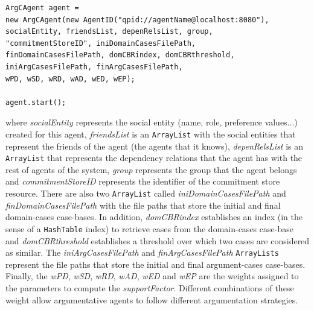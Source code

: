 \begin{lstlisting}
ArgCAgent agent =
new ArgCAgent(new AgentID("qpid://agentName@localhost:8080"),
socialEntity, friendsList, depenRelsList, group,
"commitmentStoreID", iniDomainCasesFilePath,
finDomainCasesFilePath, domCBRindex, domCBRthreshold,
iniArgCasesFilePath, finArgCasesFilePath,
wPD, wSD, wRD, wAD, wED, wEP);

agent.start();
\end{lstlisting}

where \emph{socialEntity} represents the social entity (name, role, preference values...) created for this agent, \emph{friendsList} is an \lstinline{ArrayList} with the social entities that represent the friends of the agent (the agents that it knows), \emph{depenRelsList} is an \lstinline{ArrayList} that represents the dependency relations that the agent has with the rest of agents of the system, \emph{group} represents the group that the agent belongs and \emph{commitmentStoreID} represents the identifier of the commitment store resource. There are also two \lstinline{ArrayList} called \textit{iniDomainCasesFilePath} and \textit{finDomainCasesFilePath} with the file paths that store the initial and final domain-cases case-bases. In addition, \emph{domCBRindex} establishes an index (in the sense of a \lstinline{HashTable} index) to retrieve cases from the domain-cases case-base and \emph{domCBRthreshold} establishes a threshold over which two cases are considered as similar. The \textit{iniArgCasesFilePath} and \textit{finArgCasesFilePath} \lstinline{ArrayLists} represent the file paths that store the initial and final argument-cases case-bases. Finally, the \emph{wPD}, \emph{wSD}, \emph{wRD}, \emph{wAD}, \emph{wED} and \emph{wEP} are the weights assigned to the parameters to compute the \emph{supportFactor}. Different combinations of these weight allow argumentative agents to follow different argumentation strategies.

